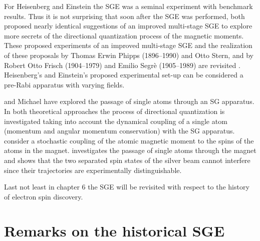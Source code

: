 \documentclass[12pt]{article}
\begin{document}
For Heisenberg and Einstein the SGE was a seminal experiment with benchmark results. Thus it is not surprising that soon after the SGE was performed, both proposed nearly identical suggestions of an improved multi-stage SGE to explore more secrets of the directional quantization process of the magnetic moments. These proposed experiments of an improved multi-stage SGE and the realization of these proposals by Thomas Erwin Phipps (1896--1990) and Otto Stern, and by Robert Otto Frisch (1904--1979) and Emilio Segrè (1905--1989)  are revisited \citep{PhippsTEtal1932Einstellung,FrischOEtal1933Einstellung}. Heisenberg's and Einstein's proposed experimental set-up can be considered a pre-Rabi apparatus with varying fields. 

\cite{WennerstroemHEtal2012experiment,WennerstroemHEtal2013measurements,WennerstroemHEtal2014Interpretation} and Michael \cite{DevereuxM2015Reduction} have explored the passage of single atoms through an SG apparatus. In both theoretical approaches the process of directional quantization is investigated taking into account the dynamical coupling of a single atom (momentum and angular momentum conservation) with the SG apparatus. \cite{WennerstroemHEtal2012experiment,WennerstroemHEtal2013measurements,WennerstroemHEtal2014Interpretation} consider a stochastic coupling of the atomic magnetic moment to the spins of the atoms in the magnet.  \cite{DevereuxM2015Reduction} investigates the passage of single atoms through the magnet and shows that the two separated spin states of the silver beam cannot interfere since their trajectories are experimentally distinguishable.
 
Last not least in chapter 6 the SGE will be revisited with respect to the history of electron spin discovery. 
 
\section{Remarks on the historical SGE} 
 
\end{document}
